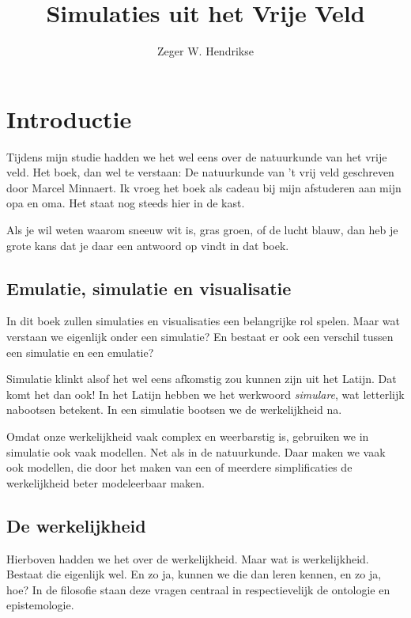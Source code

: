 \documentclass{article}      %
\title{Simulaties uit het Vrije Veld}  %
\author{Zeger W. Hendrikse}      %
\begin{document}

\maketitle                   %


\section{Introductie}

Tijdens mijn studie hadden we het wel eens over de natuurkunde van het vrije veld.
Het boek, dan wel te verstaan: De natuurkunde van 't vrij veld geschreven door Marcel Minnaert.
Ik vroeg het boek als cadeau bij mijn afstuderen aan mijn opa en oma. Het staat
nog steeds hier in de kast. 

Als je wil weten waarom sneeuw wit is, gras groen, of de lucht blauw, dan heb je
grote kans dat je daar een antwoord op vindt in dat boek. 

                             
\subsection{Emulatie, simulatie en visualisatie}

In dit boek zullen simulaties en visualisaties een belangrijke rol spelen.
Maar wat verstaan we eigenlijk onder een simulatie? En bestaat er ook een 
verschil tussen een simulatie en een emulatie?

Simulatie klinkt alsof het wel eens afkomstig zou kunnen zijn uit het Latijn.
Dat komt het dan ook! In het Latijn hebben we het werkwoord {\it simulare}, 
wat letterlijk nabootsen betekent. In een simulatie bootsen we de werkelijkheid
na. 

Omdat onze werkelijkheid vaak complex en weerbarstig is, gebruiken we in 
simulatie ook vaak modellen. Net als in de natuurkunde. Daar maken we vaak
ook modellen, die door het maken van een of meerdere simplificaties de 
werkelijkheid beter modeleerbaar maken.


\subsection{De werkelijkheid}

Hierboven hadden we het over de werkelijkheid. Maar wat is werkelijkheid. 
Bestaat die eigenlijk wel. En zo ja, kunnen we die dan leren kennen, en zo ja, 
hoe? In de filosofie staan deze vragen centraal in respectievelijk 
de ontologie en epistemologie. 
\end{document}
